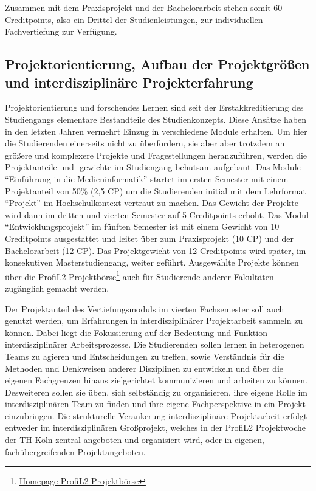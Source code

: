 Zusammen mit dem Praxisprojekt und der Bachelorarbeit stehen somit 60
Creditpoints, also ein Drittel der Studienleistungen, zur individuellen
Fachvertiefung zur Verfügung.

\subsection{Projektorientierung, Aufbau der Projektgrößen und
interdisziplinäre
Projekterfahrung\label{/mi-2017/selbstbericht/0400-studiengangskonzept/0000-studiengangskonzept}}\label{projektorientierung-aufbau-der-projektgruxf6uxdfen-und-interdisziplinuxe4re-projekterfahrungpathlabelmi-2017selbstbericht0400-studiengangskonzept0000-studiengangskonzept}

Projektorientierung und forschendes Lernen sind seit der
Erstakkreditierung des Studiengangs elementare Bestandteile des
Studienkonzepts. Diese Ansätze haben in den letzten Jahren vermehrt
Einzug in verschiedene Module erhalten. Um hier die Studierenden
einerseits nicht zu überfordern, sie aber aber trotzdem an größere und
komplexere Projekte und Fragestellungen heranzuführen, werden die
Projektanteile und -gewichte im Studiengang behutsam aufgebaut. Das
Module ``Einführung in die Medieninformatik'' startet im ersten Semester
mit einem Projektanteil von 50\% (2,5 CP) um die Studierenden initial
mit dem Lehrformat ``Projekt'' im Hochschulkontext vertraut zu machen.
Das Gewicht der Projekte wird dann im dritten und vierten Semester auf 5
Creditpoints erhöht. Das Modul ``Entwicklungsprojekt'' im fünften
Semester ist mit einem Gewicht von 10 Creditpoints ausgestattet und
leitet über zum Praxisprojekt (10 CP) und der Bachelorarbeit (12 CP).
Das Projektgewicht von 12 Creditpoints wird später, im konsekutiven
Masterstudiengang, weiter geführt. Ausgewählte Projekte können über die
ProfiL2-Projektbörse\footnote{\href{http://projektboerse-profil2.th-koeln.de/}{Homepage
  ProfiL2 Projektbörse}} auch für Studierende anderer Fakultäten
zugänglich gemacht werden.

Der Projektanteil des Vertiefungsmoduls im vierten Fachsemester soll
auch genutzt werden, um Erfahrungen in interdisziplinärer Projektarbeit
sammeln zu können. Dabei liegt die Fokussierung auf der Bedeutung und
Funktion interdisziplinärer Arbeitsprozesse. Die Studierenden sollen
lernen in heterogenen Teams zu agieren und Entscheidungen zu treffen,
sowie Verständnis für die Methoden und Denkweisen anderer Disziplinen zu
entwickeln und über die eigenen Fachgrenzen hinaus zielgerichtet
kommunizieren und arbeiten zu können. Desweiteren sollen sie üben, sich
selbständig zu organisieren, ihre eigene Rolle im interdisziplinären
Team zu finden und ihre eigene Fachperspektive in ein Projekt
einzubringen. Die strukturelle Verankerung interdisziplinäre
Projektarbeit erfolgt entweder im interdisziplinären Großprojekt,
welches in der ProfiL2 Projektwoche der TH Köln zentral angeboten und
organisiert wird, oder in eigenen, fachübergreifenden Projektangeboten.


